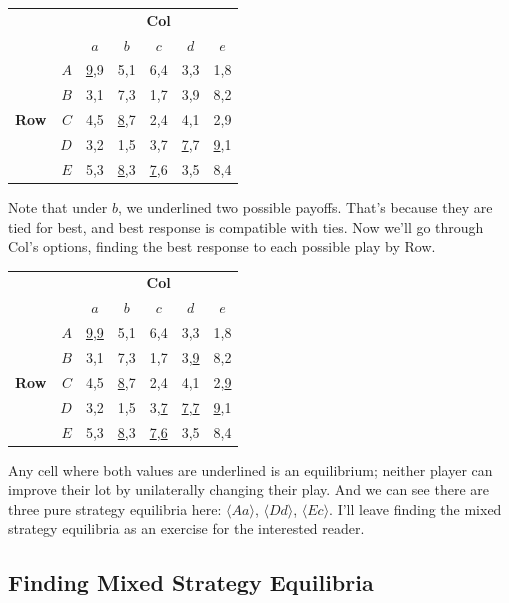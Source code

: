 \documentclass[openany]{book}
\begin{document}
\begin{center}
\begin{tabular}{l r | c c c c c}
& & \multicolumn{5}{c}{\textbf{Col}} \\
& & $a$ & $b$ & $c$ & $d$ & $e$ \\ \hline
\multirow{5}{*}{\textbf{Row}}
& $A$ & \underline{9},9 & 5,1 & 6,4 & 3,3 & 1,8\\
& $B$ & 3,1 & 7,3 & 1,7 & 3,9 & 8,2 \\
& $C$ & 4,5 & \underline{8},7 & 2,4 & 4,1 & 2,9\\
& $D$ & 3,2 & 1,5 & 3,7 & \underline{7},7 & \underline{9},1\\
& $E$ & 5,3 & \underline{8},3 & \underline{7},6 & 3,5 & 8,4
\end{tabular}
\end{center}
Note that under $b$, we underlined two possible payoffs. That's because they are tied for best, and best response is compatible with ties. Now we'll go through Col's options, finding the best response to each possible play by Row.
\begin{center}
\begin{tabular}{l r | c c c c c}
& & \multicolumn{5}{c}{\textbf{Col}} \\
& & $a$ & $b$ & $c$ & $d$ & $e$ \\ \hline
\multirow{5}{*}{\textbf{Row}}
& $A$ & \underline{9},\underline{9} & 5,1 & 6,4 & 3,3 & 1,8\\
& $B$ & 3,1 & 7,3 & 1,7 & 3,\underline{9} & 8,2 \\
& $C$ & 4,5 & \underline{8},7 & 2,4 & 4,1 & 2,\underline{9}\\
& $D$ & 3,2 & 1,5 & 3,\underline{7} & \underline{7},\underline{7} & \underline{9},1\\
& $E$ & 5,3 & \underline{8},3 & \underline{7},\underline{6} & 3,5 & 8,4
\end{tabular}
\end{center}
Any cell where both values are underlined is an equilibrium; neither player can improve their lot by unilaterally changing their play. And we can see there are three pure strategy equilibria here: $\langle Aa \rangle$, $\langle Dd \rangle$, $\langle Ec \rangle$. I'll leave finding the mixed strategy equilibria as an exercise for the interested reader.

\subsection{Finding Mixed Strategy Equilibria}
\end{document}
